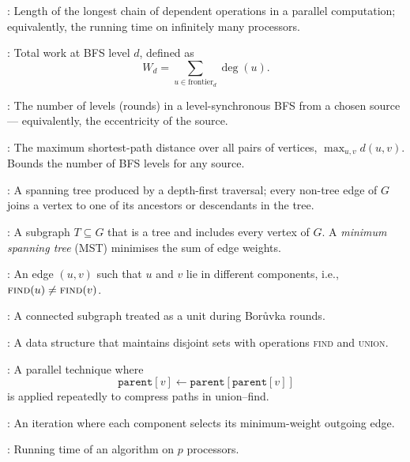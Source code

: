 \begin{ppdefn}
:
Length of the longest chain of dependent operations in a parallel computation; equivalently, the running time on infinitely many processors.
\end{ppdefn}

\begin{ppdefn}
:
Total work at BFS level $d$, defined as
\[
W_d = \sum_{u \in \text{frontier}_d} \deg(u).
\]
\end{ppdefn}

\begin{ppdefn}
:
The number of levels (rounds) in a level-synchronous BFS from a chosen source --- equivalently, the eccentricity of the source.
\end{ppdefn}

\begin{ppdefn}
:
The maximum shortest-path distance over all pairs of vertices, $\max_{u,v} d(u,v)$.  Bounds the number of BFS levels for any source.
\end{ppdefn}

\begin{ppdefn}
:
A spanning tree produced by a depth-first traversal; every non-tree edge of $G$ joins a vertex to one of its ancestors or descendants in the tree.
\end{ppdefn}

\begin{ppdefn}
:
A subgraph $T \subseteq G$ that is a tree and includes every vertex of $G$.  A \emph{minimum spanning tree} (MST) minimises the sum of edge weights.
\end{ppdefn}

\begin{ppdefn}
:
An edge $(u,v)$ such that $u$ and $v$ lie in different components, i.e., $\textsc{find}(u) \neq \textsc{find}(v)$.
\end{ppdefn}
\begin{ppdefn}
:
A connected subgraph treated as a unit during Bor\r{u}vka rounds.
\end{ppdefn}

\begin{ppdefn}
:
A data structure that maintains disjoint sets with operations \textsc{find} and \textsc{union}.
\end{ppdefn}

\begin{ppdefn}
:
A parallel technique where
\[
\texttt{parent}[v] \leftarrow \texttt{parent}[\texttt{parent}[v]]
\]
is applied repeatedly to compress paths in union--find.
\end{ppdefn}

\begin{ppdefn}
:
An iteration where each component selects its minimum-weight outgoing edge.
\end{ppdefn}

\begin{ppdefn}
:
Running time of an algorithm on $p$ processors.
\end{ppdefn}
